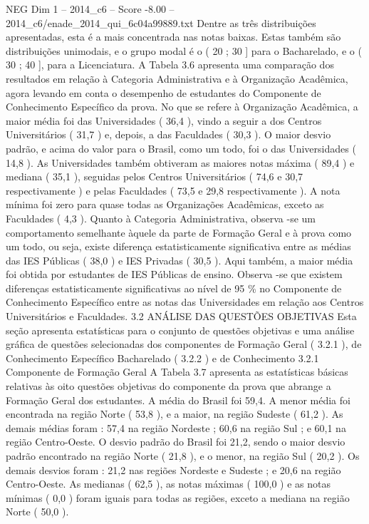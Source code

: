 \begin{textsample}{NEG Dim 1 – 2014\_c6 – Score -8.00 – 2014\_c6/enade\_2014\_qui\_6c04a99889.txt}
Dentre as três distribuições apresentadas, esta é a mais concentrada nas notas baixas.
Estas também são distribuições unimodais, e o grupo modal é o ( 20 ; 30 ] para o Bacharelado, e o ( 30 ; 40 ], para a Licenciatura.
A Tabela 3.6 apresenta uma comparação dos resultados em relação à Categoria Administrativa e à Organização Acadêmica, agora levando em conta o desempenho de estudantes do Componente de Conhecimento Específico da prova.
No que se refere à Organização Acadêmica, a maior média foi das Universidades ( 36,4 ), vindo a seguir a dos Centros Universitários ( 31,7 ) e, depois, a das Faculdades ( 30,3 ).
O maior desvio padrão, e acima do valor para o Brasil, como um todo, foi o das Universidades ( 14,8 ).
As Universidades também obtiveram as maiores notas máxima ( 89,4 ) e mediana ( 35,1 ), seguidas pelos Centros Universitários ( 74,6 e 30,7 respectivamente ) e pelas Faculdades ( 73,5 e 29,8 respectivamente ).
A nota mínima foi zero para quase todas as Organizações Acadêmicas, exceto as Faculdades ( 4,3 ).
Quanto à Categoria Administrativa, observa -se um comportamento semelhante àquele da parte de Formação Geral e à prova como um todo, ou seja, existe diferença estatisticamente significativa entre as médias das IES Públicas ( 38,0 ) e IES Privadas ( 30,5 ).
Aqui também, a maior média foi obtida por estudantes de IES Públicas de ensino.
Observa -se que existem diferenças estatisticamente significativas ao nível de 95 \% no Componente de Conhecimento Específico entre as notas das Universidades em relação aos Centros Universitários e Faculdades. 3.2 ANÁLISE DAS QUESTÕES OBJETIVAS Esta seção apresenta estatísticas para o conjunto de questões objetivas e uma análise gráfica de questões selecionadas dos componentes de Formação Geral ( 3.2.1 ), de Conhecimento Específico Bacharelado ( 3.2.2 ) e de Conhecimento 3.2.1 Componente de Formação Geral A Tabela 3.7 apresenta as estatísticas básicas relativas às oito questões objetivas do componente da prova que abrange a Formação Geral dos estudantes.
A média do Brasil foi 59,4.
A menor média foi encontrada na região Norte ( 53,8 ), e a maior, na região Sudeste ( 61,2 ).
As demais médias foram : 57,4 na região Nordeste ; 60,6 na região Sul ; e 60,1 na região Centro-Oeste.
O desvio padrão do Brasil foi 21,2, sendo o maior desvio padrão encontrado na região Norte ( 21,8 ), e o menor, na região Sul ( 20,2 ).
Os demais desvios foram : 21,2 nas regiões Nordeste e Sudeste ; e 20,6 na região Centro-Oeste.
As medianas ( 62,5 ), as notas máximas ( 100,0 ) e as notas mínimas ( 0,0 ) foram iguais para todas as regiões, exceto a mediana na região Norte ( 50,0 ).

\end{textsample}
